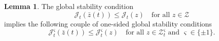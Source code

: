 \documentclass[a4paper,10pt,twoside]{amsbook}
\numberwithin{section}{chapter}
\numberwithin{equation}{chapter}
\theoremstyle{definition}
\newtheorem{lemma}[prop]{Lemma}
\newtheorem{rmk}[prop]{Remark}
\DeclarePairedDelimiter{\dual}{\langle}{\rangle}
\begin{document}
\begin{lemma}
The global stability condition
\begin{equation}
\label{eqn:min-neck}
\mathcal{J}_t(\bar{z}(t))\le\mathcal{J}_t(z)\quad\text{for all $z\in\mathscr{Z}$}
\end{equation}
implies the following couple of one-sided  global stability conditions
\begin{equation}
\label{eqn:min-neck-sigma}
\mathcal{J}_t^\varsigma(\bar{z}(t))\le\mathcal{J}_t^\varsigma(z)\quad\text{for all $z\in\mathscr{Z}^\varsigma_t$ and $\varsigma\in\{\pm1\}$}.
\end{equation}
\end{lemma}
\end{document}
